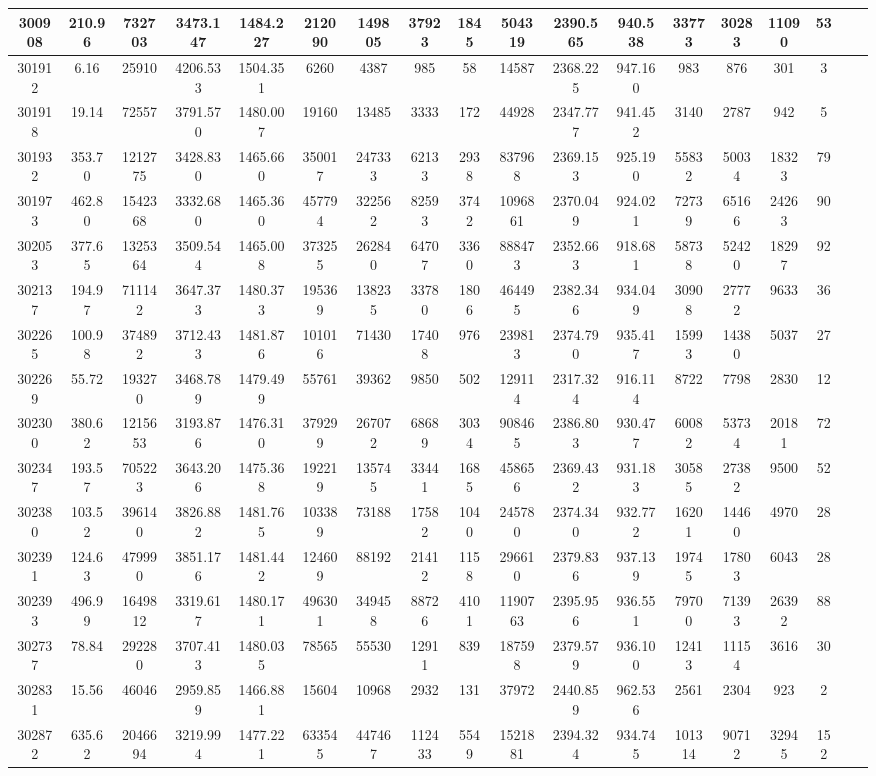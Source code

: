 \documentclass[10pt]{extarticle}
\begin{document}
\begin{longtable}{|c|c|c|c|c|c|c|c|c|c|c|c|c|c|c|c|c|c|}
\hline 
300908&210.96&732703&3473.147&1484.227&212090&149805&37923&1845&504319&2390.565&940.538&33773&30283&11090&53 \\ 
\hline 
301912&6.16&25910&4206.533&1504.351&6260&4387&985&58&14587&2368.225&947.160&983&876&301&3 \\ 
\hline 
301918&19.14&72557&3791.570&1480.007&19160&13485&3333&172&44928&2347.777&941.452&3140&2787&942&5 \\ 
\hline 
301932&353.70&1212775&3428.830&1465.660&350017&247333&62133&2938&837968&2369.153&925.190&55832&50034&18323&79 \\ 
\hline 
301973&462.80&1542368&3332.680&1465.360&457794&322562&82593&3742&1096861&2370.049&924.021&72739&65166&24263&90 \\ 
\hline 
302053&377.65&1325364&3509.544&1465.008&373255&262840&64707&3360&888473&2352.663&918.681&58738&52420&18297&92 \\ 
\hline 
302137&194.97&711142&3647.373&1480.373&195369&138235&33780&1806&464495&2382.346&934.049&30908&27772&9633&36 \\ 
\hline 
302265&100.98&374892&3712.433&1481.876&101016&71430&17408&976&239813&2374.790&935.417&15993&14380&5037&27 \\ 
\hline 
302269&55.72&193270&3468.789&1479.499&55761&39362&9850&502&129114&2317.324&916.114&8722&7798&2830&12 \\ 
\hline 
302300&380.62&1215653&3193.876&1476.310&379299&267072&68689&3034&908465&2386.803&930.477&60082&53734&20181&72 \\ 
\hline 
302347&193.57&705223&3643.206&1475.368&192219&135745&33441&1685&458656&2369.432&931.183&30585&27382&9500&52 \\ 
\hline 
302380&103.52&396140&3826.882&1481.765&103389&73188&17582&1040&245780&2374.340&932.772&16201&14460&4970&28 \\ 
\hline 
302391&124.63&479990&3851.176&1481.442&124609&88192&21412&1158&296610&2379.836&937.139&19745&17803&6043&28 \\ 
\hline 
302393&496.99&1649812&3319.617&1480.171&496301&349458&88726&4101&1190763&2395.956&936.551&79700&71393&26392&88 \\ 
\hline 
302737&78.84&292280&3707.413&1480.035&78565&55530&12911&839&187598&2379.579&936.100&12413&11154&3616&30 \\ 
\hline 
302831&15.56&46046&2959.859&1466.881&15604&10968&2932&131&37972&2440.859&962.536&2561&2304&923&2 \\ 
\hline 
302872&635.62&2046694&3219.994&1477.221&633545&447467&112433&5549&1521881&2394.324&934.745&101314&90712&32945&152 \\ 

\end{longtable}
\end{document}
